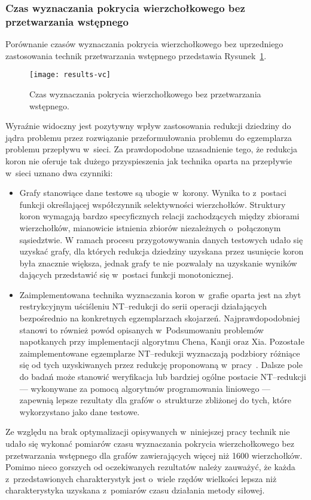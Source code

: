 \subsubsection{\textbf{Czas wyznaczania pokrycia wierzchołkowego bez przetwarzania wstępnego}}\label{time_vc}
\par{
  Porównanie czasów wyznaczania pokrycia wierzchołkowego bez uprzedniego zastosowania technik przetwarzania wstępnego przedstawia Rysunek~\ref{fig_results_vc}.
  \begin{figure}
    \centering
      \texttt{[image: results-vc]}
    \caption{Czas wyznaczania pokrycia wierzchołkowego bez przetwarzania wstępnego.}
    \label{fig_results_vc}
  \end{figure}
  Wyraźnie widoczny jest pozytywny wpływ zastosowania redukcji dziedziny do jądra problemu przez rozwiązanie przeformułowania problemu do egzemplarza problemu przepływu w~sieci.
  Za prawdopodobne uzasadnienie tego, że redukcja koron nie oferuje tak dużego przyspieszenia jak technika oparta na przepływie w~sieci uznano dwa czynniki:
  \begin{itemize}
    \item Grafy stanowiące dane testowe są ubogie w~korony.
    Wynika to z~postaci funkcji określającej współczynnik selektywności wierzchołków. Struktury koron wymagają bardzo specyficznych relacji zachodzących między zbiorami wierzchołków, mianowicie istnienia zbiorów niezależnych o~połączonym sąsiedztwie.
    W ramach procesu przygotowywania danych testowych udało się uzyskać grafy, dla których redukcja dziedziny uzyskana przez usunięcie koron była znacznie większa, jednak grafy te nie pozwalały na uzyskanie wyników dających przedstawić się w~postaci funkcji monotonicznej.
    \item Zaimplementowana technika wyznaczania koron w~grafie oparta jest na zbyt restrykcyjnym uściśleniu NT--redukcji do serii operacji działających bezpośrednio na konkretnych egzemplarzach skojarzeń.
    Najprawdopodobniej stanowi to również powód opisanych w~Podsumowaniu problemów napotkanych przy implementacji algorytmu Chena, Kanji oraz Xia.
    Pozostałe zaimplementowane egzemplarze NT--redukcji wyznaczają podzbiory różniące się od tych uzyskiwanych przez redukcję proponowaną w~pracy~\cite{KernelizationAlgorithms04}.
    Dalsze pole do badań może stanowić weryfikacja lub bardziej ogólne postacie NT--redukcji --- wykonywane za pomocą algorytmów programowania liniowego --- zapewnią lepsze rezultaty dla grafów o~strukturze zbliżonej do tych, które wykorzystano jako dane testowe.
  \end{itemize}

  Ze względu na brak optymalizacji opisywanych w~niniejszej pracy technik nie udało się wykonać pomiarów czasu wyznaczania pokrycia wierzchołkowego bez przetwarzania wstępnego dla grafów zawierających więcej niż 1600 wierzchołków.
  Pomimo nieco gorszych od oczekiwanych rezultatów należy zauważyć, że każda z~przedstawionych charakterystyk jest o~wiele rzędów wielkości lepsza niż charakterystyka uzyskana z~pomiarów czasu działania metody siłowej.
}
